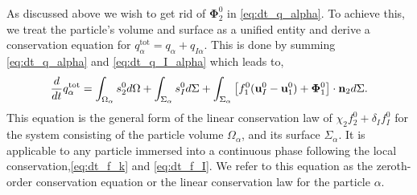 As discussed above we wish to get rid of $\mathbf{\Phi}_2^0$ in \ref{eq:dt_q_alpha}. To achieve this, we treat the particle's volume and surface as a unified entity and derive a conservation equation for $q_\alpha^\text{tot} = q_\alpha + q_{I\alpha}$. 
This is done by summing \ref{eq:dt_q_alpha} and \ref{eq:dt_q_I_alpha} which leads to, 
\begin{equation}
    \frac{d}{d t}  q_\alpha^\text{tot}
    = 
    \int_{\Omega_\alpha} s_2^0 d\Omega
    + \int_{\Sigma_\alpha} s_I^0 d\Sigma
    + \int_{\Sigma_\alpha} \left[
        f_1^0 (\textbf{u}_I^0-\textbf{u}_1^0) 
        + \mathbf{\Phi}_1^0 
        \right] \cdot \textbf{n}_2 d\Sigma. 
    \label{eq:dt_q_alpha_tot}
\end{equation}
This equation is the general form of the linear conservation law of $\chi_2 f_2^0 + \delta_I f_I^0$ for the system consisting of the particle volume $\Omega_\alpha$, and its surface $\Sigma_\alpha$. It is applicable to any particle immersed into a continuous phase following the local conservation,\ref{eq:dt_f_k} and \ref{eq:dt_f_I}.
We refer to this equation as the zeroth-order conservation equation or the linear conservation law for the particle $\alpha$.

